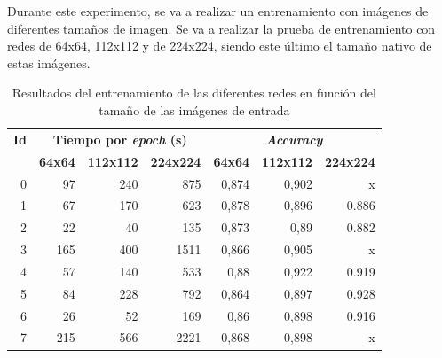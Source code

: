 Durante este experimento, se va a realizar un entrenamiento con imágenes de diferentes tamaños de imagen. Se va a realizar la prueba de entrenamiento con redes de 64x64, 112x112 y de 224x224, siendo este último el tamaño nativo de estas imágenes. 

\begin{table}[h]
\caption{Resultados del entrenamiento de las diferentes redes en función del tamaño de las imágenes de entrada}
\label{tab:resultados_exp6}
\centering
\begin{tabular}{r|rrr|rrr}
\toprule
\multicolumn{1}{c|}{\textbf{Id}} & \multicolumn{3}{c|}{\textbf{Tiempo por \textit{epoch} (s)}}                                              & \multicolumn{3}{c}{\textbf{\textit{Accuracy}}}                                                          \\
\multicolumn{1}{c|}{}   & \multicolumn{1}{c}{\textbf{64x64}} & \multicolumn{1}{c}{\textbf{112x112}} & \multicolumn{1}{c|}{\textbf{224x224}} & \multicolumn{1}{c}{\textbf{64x64}} & \multicolumn{1}{c}{\textbf{112x112}} & \multicolumn{1}{c}{\textbf{224x224}} \\ \hline
0                       & 97                        & 240                         & 875                          & 0,874                     & 0,902                       & x                           \\
1                       & 67                        & 170                         & 623                          & 0,878                     & 0,896                       & 0.886                       \\
2                       & 22                        & 40                          & 135                          & 0,873                     & 0,89                        & 0.882                       \\
3                       & 165                       & 400                         & 1511                         & 0,866                     & 0,905                       & x                           \\
4                       & 57                        & 140                         & 533                          & 0,88                      & 0,922                       & 0.919                       \\
5                       & 84                        & 228                         & 792                          & 0,864                     & 0,897                       & 0.928                       \\
6                       & 26                        & 52                          & 169                          & 0,86                      & 0,898                       & 0.916                       \\
7                       & 215                       & 566                         & 2221                         & 0,868                     & 0,898                       & x  \\
\bottomrule
\end{tabular}
\end{table}

